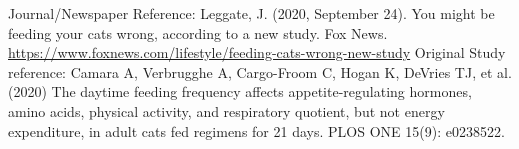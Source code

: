\documentclass[]{article}
\begin{document}
Journal/Newspaper Reference: Leggate, J. (2020, September 24). You might
be feeding your cats wrong, according to a new study. Fox News.
\url{https://www.foxnews.com/lifestyle/feeding-cats-wrong-new-study}
Original Study reference: Camara A, Verbrugghe A, Cargo-Froom C, Hogan
K, DeVries TJ, et al. (2020) The daytime feeding frequency affects
appetite-regulating hormones, amino acids, physical activity, and
respiratory quotient, but not energy expenditure, in adult cats fed
regimens for 21 days. PLOS ONE 15(9): e0238522.
\end{document}
